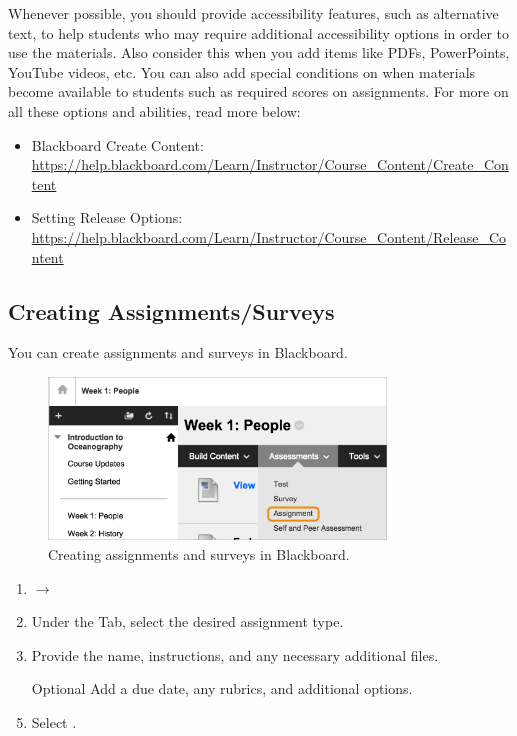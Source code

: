 Whenever possible, you should provide accessibility features, such as alternative text, to help students who may require additional accessibility options in order to use the materials. Also consider this when you add items like PDFs, PowerPoints, YouTube videos, etc. You can also add special conditions on when materials become available to students such as required scores on assignments. For more on all these options and abilities, read more below:

	\begin{itemize}
	\item Blackboard Create Content: \url{https://help.blackboard.com/Learn/Instructor/Course_Content/Create_Content}
	\item Setting Release Options: \url{https://help.blackboard.com/Learn/Instructor/Course_Content/Release_Content}
	\end{itemize}



\subsection{Creating Assignments/Surveys}

You can create assignments and surveys in Blackboard. 

	\begin{figure}[!ht]
	\centering
	\includegraphics[width=0.8\textwidth]{sections/blackboard/images/assignment_access_original.png}
	\caption{Creating assignments and surveys in Blackboard.}
	\end{figure}

	\begin{enumerate}[1.]
	\item {} $\to$ 
	\item Under the  Tab, select the desired assignment type.
	\item Provide the name, instructions, and any necessary additional files. 
	\item [Optional] Add a due date, any rubrics, and additional options. 
	\item Select .
	\end{enumerate}

